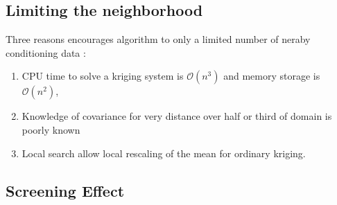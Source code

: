 \documentclass[twocolumn]{article}
\numberwithin{equation}{section}
\begin{document}
\subsection{Limiting the neighborhood}
Three reasons encourages algorithm to only a limited number of neraby conditioning data : 
\begin{enumerate}
	\item CPU time to solve a kriging system is $\mathcal{O}({n^3})$ and memory storage is $\mathcal{O}({n^2})$,
	\item Knowledge of covariance for very distance over half or third of domain is poorly known 
	\item Local search allow local rescaling of the mean for ordinary kriging.
\end{enumerate} 

\subsection{Screening Effect}

 
\end{document}
